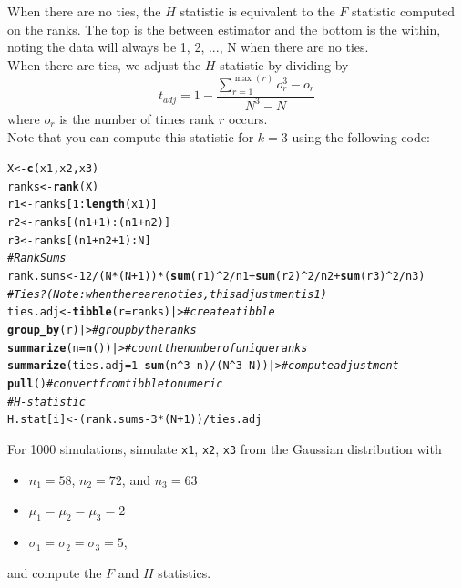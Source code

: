 \documentclass{article}\usepackage[]{graphicx}\usepackage[]{xcolor}
\makeatletter
\newcommand{\hlnum}[1]{\textcolor[rgb]{0.686,0.059,0.569}{#1}}%
\newcommand{\hlcom}[1]{\textcolor[rgb]{0.678,0.584,0.686}{\textit{#1}}}%
\newcommand{\hlopt}[1]{\textcolor[rgb]{0,0,0}{#1}}%
\newcommand{\hldef}[1]{\textcolor[rgb]{0.345,0.345,0.345}{#1}}%
\newcommand{\hlkwb}[1]{\textcolor[rgb]{0.69,0.353,0.396}{#1}}%
\newcommand{\hlkwc}[1]{\textcolor[rgb]{0.333,0.667,0.333}{#1}}%
\newcommand{\hlkwd}[1]{\textcolor[rgb]{0.737,0.353,0.396}{\textbf{#1}}}%
\newenvironment{kframe}{%
 \def\at@end@of@kframe{}%
 \ifinner\ifhmode%
  \def\at@end@of@kframe{\end{minipage}}%
  \begin{minipage}{\columnwidth}%
 \fi\fi%
 \def\FrameCommand##1{\hskip\@totalleftmargin \hskip-\fboxsep
 \colorbox{shadecolor}{##1}\hskip-\fboxsep
     \hskip-\linewidth \hskip-\@totalleftmargin \hskip\columnwidth}%
 \MakeFramed {\advance\hsize-\width
   \@totalleftmargin\z@ \linewidth\hsize
   \@setminipage}}%
 {\par\unskip\endMakeFramed%
 \at@end@of@kframe}
\newenvironment{knitrout}{}{} %
\makeatother
\begin{document}
\begin{enumerate}
When there are no ties, the $H$ statistic is equivalent to the $F$ statistic 
computed on the ranks. The top is the between estimator and the bottom is
the within, noting the data will always be 1, 2, ..., N when there are no
ties.\\

When there are ties, we adjust the $H$ statistic by dividing by
\[t_{adj} = 1 - \frac{\sum_{r=1}^{\max(r)} o_r^3-o_r}{N^3-N}\]
where $o_r$ is the number of times rank $r$ occurs.\\

Note that you can compute this statistic for $k=3$ using the following code:
\begin{knitrout}\scriptsize
{}\color{fgcolor}\begin{kframe}
\begin{alltt}
\hldef{X} \hlkwb{<-} \hlkwd{c}\hldef{(x1, x2, x3)}
\hldef{ranks} \hlkwb{<-} \hlkwd{rank}\hldef{(X)}
\hldef{r1} \hlkwb{<-} \hldef{ranks[}\hlnum{1}\hlopt{:}\hlkwd{length}\hldef{(x1)]}
\hldef{r2} \hlkwb{<-} \hldef{ranks[(n1}\hlopt{+}\hlnum{1}\hldef{)}\hlopt{:}\hldef{(n1}\hlopt{+}\hldef{n2)]}
\hldef{r3} \hlkwb{<-} \hldef{ranks[(n1}\hlopt{+}\hldef{n2}\hlopt{+}\hlnum{1}\hldef{)}\hlopt{:}\hldef{N]}
\hlcom{# Rank Sums}
\hldef{rank.sums} \hlkwb{<-} \hlnum{12}\hlopt{/}\hldef{(N}\hlopt{*}\hldef{(N}\hlopt{+}\hlnum{1}\hldef{))} \hlopt{*} \hldef{(}\hlkwd{sum}\hldef{(r1)}\hlopt{^}\hlnum{2}\hlopt{/}\hldef{n1} \hlopt{+} \hlkwd{sum}\hldef{(r2)}\hlopt{^}\hlnum{2}\hlopt{/}\hldef{n2} \hlopt{+} \hlkwd{sum}\hldef{(r3)}\hlopt{^}\hlnum{2}\hlopt{/}\hldef{n3)}
\hlcom{# Ties? (Note: when there are no ties, this adjustment is 1)}
\hldef{ties.adj} \hlkwb{<-} \hlkwd{tibble}\hldef{(}\hlkwc{r}\hldef{=ranks) |>} \hlcom{# create a tibble}
  \hlkwd{group_by}\hldef{(r) |>}               \hlcom{# group by the ranks}
  \hlkwd{summarize}\hldef{(}\hlkwc{n}\hldef{=}\hlkwd{n}\hldef{())|>}           \hlcom{# count the number of unique ranks}
  \hlkwd{summarize}\hldef{(}\hlkwc{ties.adj} \hldef{=} \hlnum{1}\hlopt{-}\hlkwd{sum}\hldef{(n}\hlopt{^}\hlnum{3}\hlopt{-}\hldef{n)}\hlopt{/}\hldef{(N}\hlopt{^}\hlnum{3}\hlopt{-}\hldef{N))|>} \hlcom{# compute adjustment}
  \hlkwd{pull}\hldef{()} \hlcom{# convert from tibble to numeric}
\hlcom{# H-statistic}
\hldef{H.stat[i]} \hlkwb{<-} \hldef{(rank.sums} \hlopt{-} \hlnum{3}\hlopt{*}\hldef{(N}\hlopt{+}\hlnum{1}\hldef{))}\hlopt{/}\hldef{ties.adj}
\end{alltt}
\end{kframe}
\end{knitrout}
For 1000 simulations, simulate \texttt{x1}, \texttt{x2}, \texttt{x3} from the 
Gaussian distribution with 
\begin{itemize}
\item $n_1=58$, $n_2=72$, and $n_3=63$
\item $\mu_1=\mu_2=\mu_3=2$
\item $\sigma_1=\sigma_2=\sigma_3=5$,
\end{itemize}
and compute the $F$ and $H$ statistics.


\end{enumerate}
\end{document}
